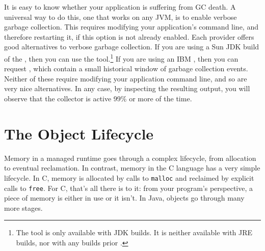It is easy to know whether your application is suffering from GC death. A
universal way to do this, one that works on any JVM, is to enable verbose
garbage collection. This requires modifying
your application's command line, and therefore restarting it, if this option is
not already enabled. Each \jre provider offers good alternatives to verbose
garbage collection. If you are using a Sun JDK build of the \jre, then you can
use the  tool.\footnote{The  tool
is only available with JDK builds. It is neither available with JRE builds, nor
with any builds prior \javafive.} If you are using an IBM \jre, then you can
request , which contain a small historical window of  garbage
collection events. Neither of these require modifying your
application command line, and so are very nice alternatives. In any case, by
inspecting the resulting output, you will observe that the collector is active
99\% or more of the time.




\section{The Object Lifecycle}

Memory in a managed runtime goes through a complex lifecycle, from allocation to
eventual reclamation. In contrast, memory in the C language has a very simple
lifecycle. In C, memory is allocated by calls to {\tt malloc} and reclaimed by
explicit calls to {\tt free}. For C, that's all there is to it: from your
program's perspective, a piece of memory is either in use or it isn't. In Java,
objects go through many more stages. 



